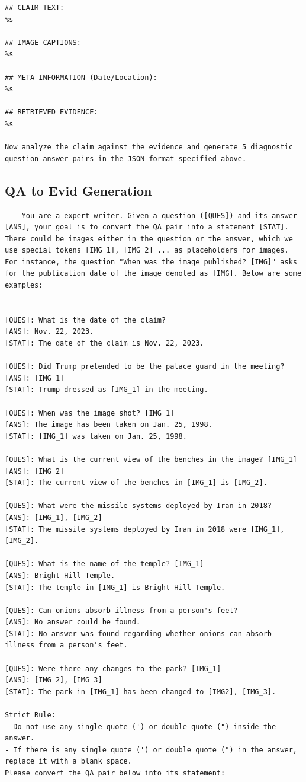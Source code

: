 \begin{verbatim}
## CLAIM TEXT:
%s

## IMAGE CAPTIONS:
%s

## META INFORMATION (Date/Location):
%s

## RETRIEVED EVIDENCE:
%s

Now analyze the claim against the evidence and generate 5 diagnostic
question-answer pairs in the JSON format specified above.
\end{verbatim}

\subsection{QA to Evid Generation}
\label{ch:appendix_qa_conversion}
\begin{verbatim}
    You are a expert writer. Given a question ([QUES]) and its answer [ANS], your goal is to convert the QA pair into a statement [STAT]. There could be images either in the question or the answer, which we use special tokens [IMG_1], [IMG_2] ... as placeholders for images. For instance, the question "When was the image published? [IMG]" asks for the publication date of the image denoted as [IMG]. Below are some examples:


[QUES]: What is the date of the claim?
[ANS]: Nov. 22, 2023.
[STAT]: The date of the claim is Nov. 22, 2023.

[QUES]: Did Trump pretended to be the palace guard in the meeting?
[ANS]: [IMG_1]
[STAT]: Trump dressed as [IMG_1] in the meeting.

[QUES]: When was the image shot? [IMG_1]
[ANS]: The image has been taken on Jan. 25, 1998.
[STAT]: [IMG_1] was taken on Jan. 25, 1998.

[QUES]: What is the current view of the benches in the image? [IMG_1]
[ANS]: [IMG_2]
[STAT]: The current view of the benches in [IMG_1] is [IMG_2].

[QUES]: What were the missile systems deployed by Iran in 2018?
[ANS]: [IMG_1], [IMG_2]
[STAT]: The missile systems deployed by Iran in 2018 were [IMG_1], [IMG_2].

[QUES]: What is the name of the temple? [IMG_1]
[ANS]: Bright Hill Temple.
[STAT]: The temple in [IMG_1] is Bright Hill Temple.

[QUES]: Can onions absorb illness from a person's feet?
[ANS]: No answer could be found.
[STAT]: No answer was found regarding whether onions can absorb illness from a person's feet. 

[QUES]: Were there any changes to the park? [IMG_1]
[ANS]: [IMG_2], [IMG_3]
[STAT]: The park in [IMG_1] has been changed to [IMG2], [IMG_3].

Strict Rule:
- Do not use any single quote (') or double quote (") inside the answer.
- If there is any single quote (') or double quote (") in the answer, replace it with a blank space.
Please convert the QA pair below into its statement: 
\end{verbatim}


